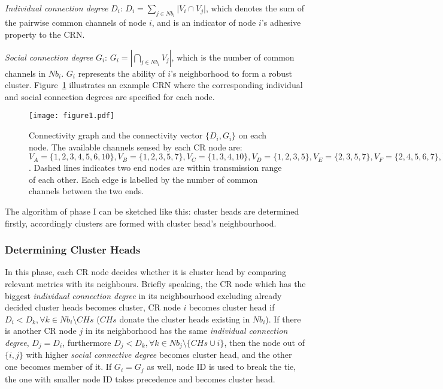 \textit{Individual connection degree} $D_i$: $D_i=\sum_{j\in Nb_i}\vert V_i\cap V_j\vert$, which denotes the sum of the pairwise common channels of node $i$, and is an indicator of node $i$'s adhesive property to the CRN. 

\textit{Social connection degree} $G_i$: $G_i=|\bigcap_{j\in Nb_i}V_j|$, which is the number of common channels in $Nb_i$. $G_i$ represents the ability of $i$'s neighborhood to form a robust cluster. Figure~\ref{fig1} illustrates an example CRN where the corresponding individual and social connection degrees are specified for each node.
\begin{figure}[ht!]
  \centering
\texttt{[image: figure1.pdf]}
	\caption{Connectivity graph and the connectivity vector $\{D_i, G_i\}$ on each node. The available channels sensed by each CR node are: $V_A=\{1,2,3,4,5,6,10\}, V_B=\{1,2,3,5,7\}, V_C=\{1,3,4,10\}, V_D=\{1,2,3,5\}, V_E=\{2,3,5,7\}, V_F=\{2,4,5,6,7\}, V_G=\{1,2,3,4,8\}, V_H=\{1,2,5,8\}$. Dashed lines indicates two end nodes are within transmission range of each other. Each edge is labelled by the number of common channels between the two ends.}
	\label{fig1}
\end{figure}

The algorithm of phase I can be sketched like this: cluster heads are determined firstly, accordingly clusters are formed with cluster head's neighbourhood.

\subsubsection*{Determining Cluster Heads}
In this phase, each CR node decides whether it is cluster head by comparing relevant metrics with its neighbours.
Briefly speaking, the CR node which has the biggest \textit{individual connection degree} in its neighbourhood excluding already decided cluster heads becomes cluster, \ie CR node $i$ becomes cluster head if $D_i<D_k, \forall k\in Nb_i\setminus CHs$ ($CHs$ donate the cluster heads existing in $Nb_i$).
If there is another CR node $j$ in its neighborhood has the same \textit{individual connection degree}, \ie $D_j = D_i$, furthermore $D_j < D_{k}, \forall k\in Nb_j\setminus \{CHs\cup i\}$, then the node out of $\{i, j\}$ with higher \textit{social connective degree} becomes cluster head, and the other one becomes member of it. 
If $G_i = G_j$ as well, node ID is used to break the tie, \ie the one with smaller node ID takes precedence and becomes cluster head.

